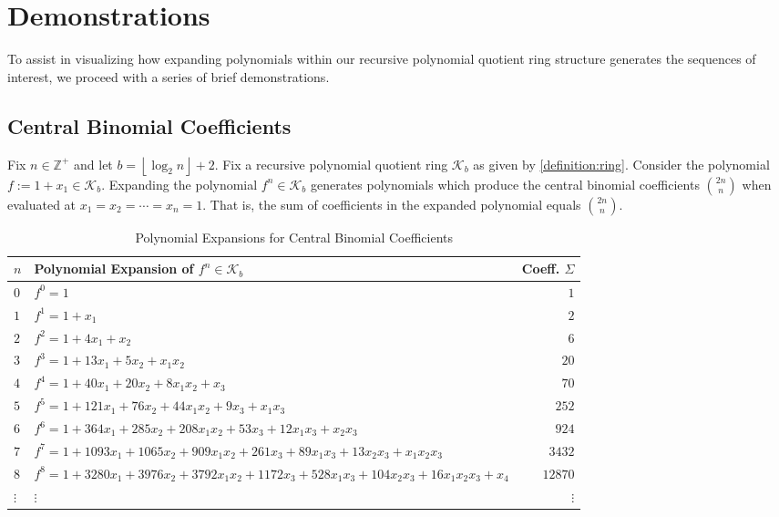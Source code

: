 \documentclass[12pt,reqno]{article}
\theoremstyle{plain}
\newcommand{\floor}[1]{\left\lfloor #1 \right\rfloor}
\newcommand{\Z}{\mathbb{Z}}
\newcommand{\K}{\mathcal{K}}
\begin{document}
\section{Demonstrations}
To assist in visualizing how expanding polynomials within our recursive polynomial quotient ring structure generates the sequences of interest, we proceed with a series of brief demonstrations.

\subsection{Central Binomial Coefficients} \label{section:demonstrations:cbc}
Fix $n \in \Z^+$ and let $b={\floor{\log_2 n}+2}$. Fix a recursive polynomial quotient ring $\K_b$ as given by \cref{definition:ring}. Consider the polynomial $f := 1 + x_1 \in \K_b$. Expanding the polynomial $f^n \in \K_b$ generates polynomials which produce the central binomial coefficients $\binom{2n}{n}$ when evaluated at $x_1=x_2=\cdots=x_n=1$. That is, the sum of coefficients in the expanded polynomial equals $\binom{2n}{n}$.
\begin{table}[ht]
\small
\begin{tabularx}{\textwidth}{|l|X|r|}
\hline
$n$ & Polynomial Expansion of $f^n \in \K_b$ & Coeff. $\Sigma$ \\
\hline
$0$ & $f^0 = 1$ & $1$ \\
$1$ & $f^1 = 1+x_1$ & $2$ \\
$2$ & $f^2 = 1+4x_1+x_2$ & $6$ \\
$3$ & $f^3 = 1+13x_1+5x_2+x_1x_2$ & $20$ \\
$4$ & $f^4 = 1+40x_1+20x_2+8x_1x_2+x_3$ & $70$ \\
$5$ & $f^5 = 1+121x_1+76x_2+44x_1x_2+9x_3+x_1x_3$ & $252$ \\
$6$ & $f^6 = 1+364x_1+285x_2+208x_1x_2+53x_3+12x_1x_3+x_2x_3$ & $924$ \\
$7$ & $f^7 = 1+1093x_1+1065x_2+909x_1x_2+261x_3+89x_1x_3+13x_2x_3+x_1x_2x_3$
& $3432$ \\
$8$ & $f^8 = 1+3280x_1+3976x_2+3792x_1x_2+1172x_3+528x_1x_3+104x_2x_3+16x_1x_2x_3+x_4$ & $12870$ \\
$\vdots$ & $\vdots$ & $\vdots$ \\
\hline
\end{tabularx}
\normalsize
\caption{Polynomial Expansions for Central Binomial Coefficients}
\label{table1}
\end{table}
\FloatBarrier
\end{document}
